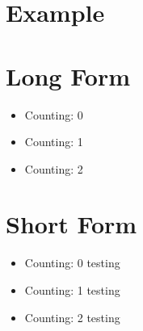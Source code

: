 \documentclass{article}
\begin{document}
\section{Example}

\section{Long Form}
\begin{itemize}
  \item Counting: 0
  \item Counting: 1
  \item Counting: 2
\end{itemize}

\section{Short Form}

\begin{itemize}
  \item Counting: 0
  testing
  \item Counting: 1
  testing
  \item Counting: 2
  testing
\end{itemize}
\end{document}
